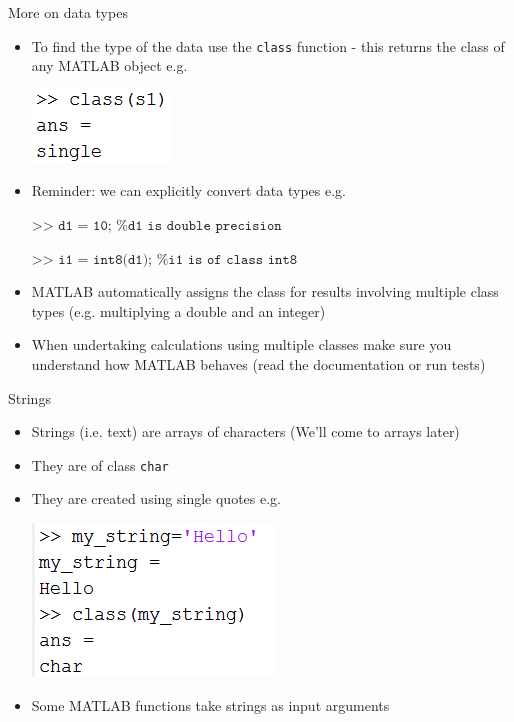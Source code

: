 \documentclass{beamer}
\begin{document}
\begin{frame}{More on data types}
	\begin{itemize}
		\item To find the type of the data use the \texttt{class} function - this returns the class of any MATLAB object e.g.
		
		\includegraphics[scale=0.7]{return_class}
		\item Reminder: we can explicitly convert data types e.g.
		
		$\texttt{>> d1 = 10; \% d1 is double precision}$
		
		$\texttt{>> i1 = int8(d1); \% i1 is of class int8}$
		\item MATLAB automatically assigns the class for results involving multiple class types (e.g. multiplying a double and an integer)
		\item When undertaking calculations using multiple classes make sure you understand how MATLAB behaves (read the documentation or run tests)
	\end{itemize}
\end{frame}

\begin{frame}{Strings}
	\begin{itemize}
		\item Strings (i.e. text) are arrays of characters (We'll come to arrays later)
		\item They are of class \texttt{char}
		\item They are created using single quotes e.g.
		
		\includegraphics[scale=0.7]{string}
		\item Some MATLAB functions take strings as input arguments
	\end{itemize}
\end{frame}
\end{document}
